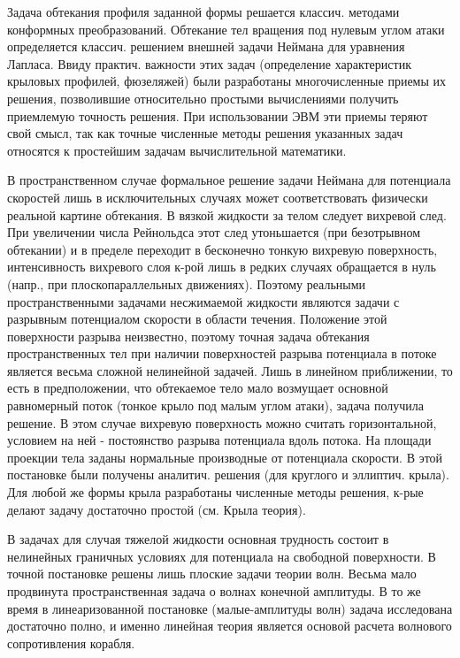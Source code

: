 \documentclass[10pt]{article}
\begin{document}
Задача обтекания профиля заданной формы решается классич. методами конформных преобразований. Обтекание тел вращения под нулевым углом атаки определяется классич. решением внешней задачи Неймана для уравнения Лапласа. Ввиду практич. важности этих задач (определение характеристик крыловых профилей, фюзеляжей) были разработаны многочисленные приемы их решения, позволившие относительно простыми вычислениями получить приемлемую точность решения. При использовании ЭВМ эти приемы теряют свой смысл, так как точные численные методы решения указанных задач относятся к простейшим задачам вычислительной математики.



В пространственном случае формальное решение задачи Неймана для потенциала скоростей лишь в исключительных случаях может соответствовать физически реальной картине обтекания. В вязкой жидкости за телом следует вихревой след. При увеличении числа Рейнольдса этот след утоньшается (при безотрывном обтекании) и в пределе переходит в бесконечно тонкую вихревую поверхность, интенсивность вихревого слоя к-рой лишь в редких случаях обращается в нуль (напр., при плоскопараллельных движениях). Поэтому реальными пространственными задачами несжимаемой жидкости являются задачи с разрывным потенциалом скорости в области течения. Положение этой поверхности разрыва неизвестно, поэтому точная задача обтекания пространственных тел при наличии поверхностей разрыва потенциала в потоке является весьма сложной нелинейной задачей. Лишь в линейном приближении, то есть в предположении, что обтекаемое тело мало возмущает основной равномерный поток (тонкое крыло под малым углом атаки), задача получила решение. В этом случае вихревую поверхность можно считать горизонтальной, условием на ней - постоянство разрыва потенциала вдоль потока. На площади проекции тела заданы нормальные производные от потенциала скорости. В этой постановке были получены аналитич. решения (для круглого и эллиптич. крыла). Для любой же формы крыла разработаны численные методы решения, к-рые делают задачу достаточно простой (см. Крыла теория).



В задачах для случая тяжелой жидкости основная трудность состоит в нелинейных граничных условиях для потенциала на свободной поверхности. В точной постановке решены лишь плоские задачи теории волн. Весьма мало продвинута пространственная задача о волнах конечной амплитуды. В то же время в линеаризованной постановке (малые-амплитуды волн) задача исследована достаточно полно, и именно линейная теория является основой расчета волнового сопротивления корабля.
\end{document}
